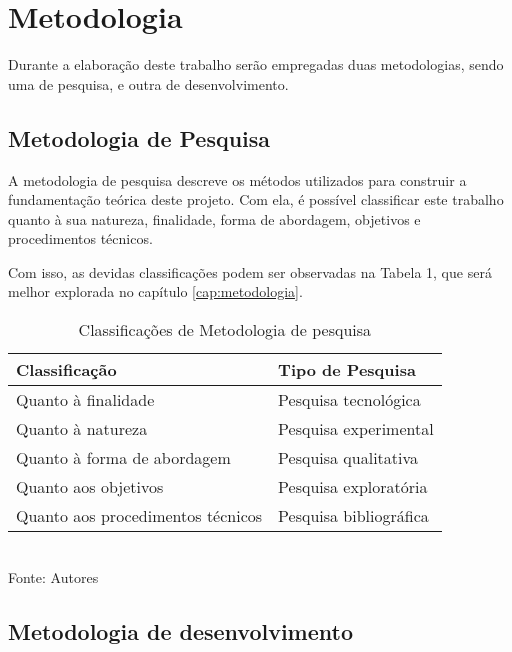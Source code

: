 \section{Metodologia}

Durante a elaboração deste trabalho serão empregadas duas metodologias, sendo uma de pesquisa, e outra de desenvolvimento.

\subsection{Metodologia de Pesquisa}

A metodologia de pesquisa descreve os métodos utilizados para construir a fundamentação teórica deste projeto. Com ela, é possível classificar este trabalho quanto à sua natureza, finalidade, forma de abordagem, objetivos e procedimentos técnicos.

Com isso, as devidas classificações podem ser observadas na Tabela 1, que será melhor explorada no capítulo \ref{cap:metodologia}.

\setlength{\extrarowheight}{5pt}

\begin{table}
    \centering
    \caption{Classificações de Metodologia de pesquisa}
    \begin{tabular}{|l|l|}
        \hline
        \textbf{Classificação}            & \textbf{Tipo de Pesquisa}\\ 
        \hline
        Quanto à finalidade               & Pesquisa tecnológica \\ 
        \hline
        Quanto à natureza                 & Pesquisa experimental \\ 
        \hline
        Quanto à forma de abordagem       & Pesquisa qualitativa \\
        \hline
        Quanto aos objetivos              & Pesquisa exploratória \\
        \hline
        Quanto aos procedimentos técnicos & Pesquisa bibliográfica \\        
        \hline
    \end{tabular}
    \label{tab:tipo_pesquisa}
    \vspace{5mm} \\ 
    {\footnotesize Fonte: Autores} 
\end{table}

\subsection{Metodologia de desenvolvimento}

